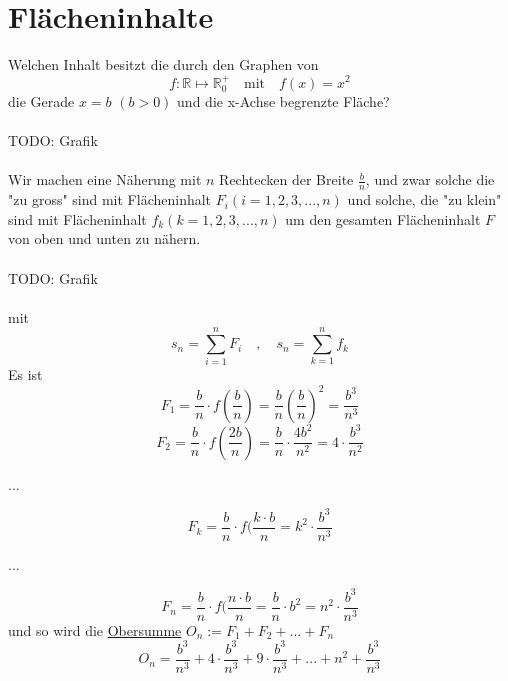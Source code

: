 \documentclass{report}
\begin{document}
\section{Flächeninhalte}
Welchen Inhalt besitzt die durch den Graphen von
\begin{equation}f: \mathbb{R} \mapsto \mathbb{R}_0^+ \quad \mbox{mit} \quad f(x) = x^2\end{equation}
die Gerade $x=b$ $(b > 0)$ und die x-Achse begrenzte Fläche?
\\\\TODO: Grafik\\\\
Wir machen eine Näherung mit $n$ Rechtecken der Breite $\frac{b}{n}$, und zwar solche die "zu gross" sind mit Flächeninhalt $F_i (i=1,2,3,...,n)$ und solche, die "zu klein" sind mit Flächeninhalt $f_k (k=1,2,3,...,n)$ um den gesamten Flächeninhalt $F$ von oben und unten zu nähern.
\\\\TODO: Grafik\\\\
mit
\begin{equation}s_n = \sum_{i=1}^n F_i \quad , \quad s_n = \sum_{k=1}^n f_k\end{equation}
Es ist
\begin{equation}F_1 = \frac{b}{n} \cdot f(\frac{b}{n}) = \frac{b}{n} (\frac{b}{n})^2 = \frac{b^3}{n^3}\end{equation}
\begin{equation}F_2 = \frac{b}{n} \cdot f(\frac{2b}{n}) = \frac{b}{n} \cdot \frac{4b^2}{n^2} = 4 \cdot \frac{b^3}{n^2}\end{equation}
\begin{center}...\end{center}
\begin{equation}F_k = \frac{b}{n} \cdot f(\frac{k \cdot b}{n} = k^2 \cdot \frac{b^3}{n^3}\end{equation}
\begin{center}...\end{center}
\begin{equation}F_n = \frac{b}{n} \cdot f(\frac{n \cdot b}{n} = \frac{b}{n} \cdot b^2 = n^2 \cdot \frac{b^3}{n^3}\end{equation}
und so wird die \underline{Obersumme} $O_n := F_1 + F_2 + ... + F_n$
\begin{equation}O_n = \frac{b^3}{n^3} + 4 \cdot \frac{b^3}{n^3} + 9 \cdot \frac{b^3}{n^3} + ... + n^2+\frac{b^3}{n^3}\end{equation}
\end{document}
